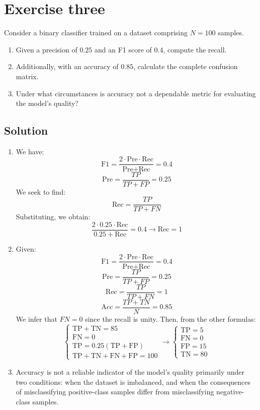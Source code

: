 \section{Exercise three}

Consider a binary classifier trained on a dataset comprising $N = 100$ samples.
\begin{enumerate}
    \item Given a precision of $0.25$ and an F1 score of $0.4$, compute the recall.
    \item Additionally, with an accuracy of $0.85$, calculate the complete confusion matrix.
    \item Under what circumstances is accuracy not a dependable metric for evaluating the model's quality?
\end{enumerate}

\subsection*{Solution}
\begin{enumerate}
    \item We have:
        \[\text{F1}=\dfrac{2\cdot\text{Pre}\cdot\text{Rec}}{\text{Pre}+\text{Rec}}=0.4\]
        \[\text{Pre}=\dfrac{TP}{TP+FP}=0.25\]
        We seek to find:
        \[\text{Rec}=\dfrac{TP}{TP+FN}\]
        Substituting, we obtain:
        \[\dfrac{2\cdot0.25\cdot\text{Rec}}{0.25+\text{Rec}}=0.4\rightarrow \text{Rec}=1\]
    \item Given:
        \[\text{F1}=\dfrac{2\cdot\text{Pre}\cdot\text{Rec}}{\text{Pre}+\text{Rec}}=0.4\]
        \[\text{Pre}=\dfrac{TP}{TP+FP}=0.25\]
        \[\text{Rec}=\dfrac{TP}{TP+FN}=1\]
        \[\text{Acc}=\dfrac{TP+TN}{N}=0.85\]
        We infer that $FN=0$ since the recall is unity. 
        Then, from the other formulas:
        \[\begin{cases}
            \text{TP}+\text{TN}=85 \\
            \text{FN}=0 \\
            \text{TP}=0.25(\text{TP}+\text{FP}) \\
            \text{TP}+\text{TN}+\text{FN}+\text{FP}=100
        \end{cases} \rightarrow \begin{cases}
            \text{TP}=5 \\
            \text{FN}=0 \\
            \text{FP}=15 \\
            \text{TN}=80
        \end{cases}\]
    \item Accuracy is not a reliable indicator of the model's quality primarily under two conditions: when the dataset is imbalanced, and when the consequences of misclassifying positive-class samples differ from misclassifying negative-class samples.
\end{enumerate}